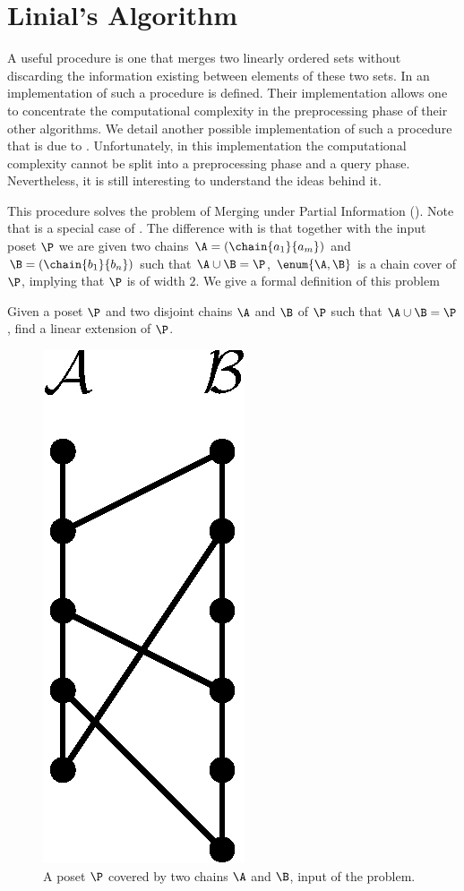 \section{Linial's Algorithm}

A useful procedure is one that merges two linearly ordered sets without
discarding the information existing between elements of these two sets. In
\citet*{cardinal:2013} an implementation of such a procedure is defined. Their
implementation allows one to concentrate the computational complexity
in the preprocessing phase of their other algorithms.
We detail another possible implementation of such a procedure that is due
to \citet*{linial:1984}. Unfortunately, in this implementation the
computational complexity cannot be split into a preprocessing phase and a query
phase. Nevertheless, it is still interesting to understand the ideas behind it.

This procedure solves the problem of Merging under Partial Information
(\MUPI). Note that \MUPI is a special case of \SUPI. The difference with
\SUPI is that together with the input poset \(\P\) we are given two chains \(\A
= (\chain{a_1}{a_m})\) and \(\B = (\chain{b_1}{b_n})\) such that \(\A \cup \B =
\P\), \ie \(\enum{\A,\B}\) is a chain cover of \(\P\), implying that \(\P\) is
of width \(2\). We give a formal definition of this problem
\begin{problem}
Given a poset \(\P\) and two disjoint chains \(\A\) and \(\B\) of \(\P\) such that \(\A \cup \B =
\P\), find a linear extension of \(\P\).
\end{problem}

\begin{figure}
\centering
\includegraphics[height=0.2\textheight]{fig/supi/mupi}
\caption{A poset \(\P\) covered by two chains \(\A\) and \(\B\),
input of the \MUPI problem.}
\label{fig:supi:mupi}
\end{figure}

